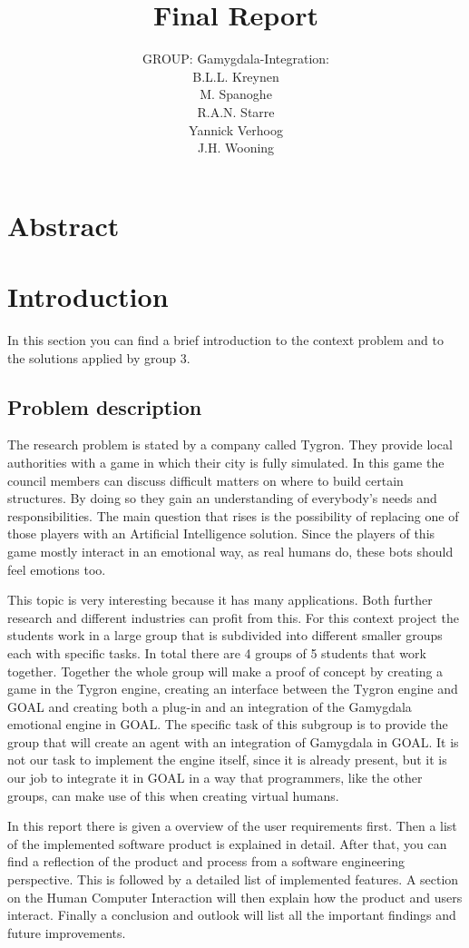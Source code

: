 \documentclass[]{article}
\title{Final Report}
\author{GROUP: Gamygdala-Integration:\\
	B.L.L. Kreynen\\
	M. Spanoghe\\
	R.A.N. Starre\\
	Yannick Verhoog\\
	J.H. Wooning\\
	}
\begin{document}
\maketitle
\pagebreak
\tableofcontents
\pagebreak
\section{Abstract}

\section{Introduction}
In this section you can find a brief introduction to the context problem and to the solutions applied by group 3. 
\subsection{Problem description}
The research problem is stated by a company called Tygron. They provide local authorities with a game in which their city is fully simulated. In this game the council members can discuss difficult matters on where to build certain structures. By doing so they gain an understanding of everybody's needs and responsibilities. The main question that rises is the possibility of replacing one of those players with an Artificial Intelligence solution. Since the players of this game mostly interact in an emotional way, as real humans do, these bots should feel emotions too.\par 
This topic is very interesting because it has many applications. Both further research and different industries can profit from this. For this context project the students work in a large group that is subdivided into different smaller groups each with specific tasks. In total there are 4 groups of 5 students that work together. Together the whole group will make a proof of concept by creating a game in the Tygron engine\cite{Tygron}, creating an interface between the Tygron engine and \gls{GOAL} and creating both a plug-in and an integration of the \gls{Gamygdala} emotional engine in GOAL. The specific task of this subgroup is to provide the group that will create an agent with an integration of Gamygdala in GOAL. It is not our task to implement the engine itself, since it is already present, but it is our job to integrate it in GOAL in a way that programmers, like the other groups, can make use of this when creating virtual humans.\par 
In this report there is given a overview of the user requirements first. Then a list of the implemented software product is explained in detail. After that, you can find a reflection of the product and process from a software engineering perspective. This is followed by a detailed list of implemented features. A section on the Human Computer Interaction will then explain how the product and users interact. Finally a conclusion and outlook will list all the important findings and future improvements.
\\
\end{document}
